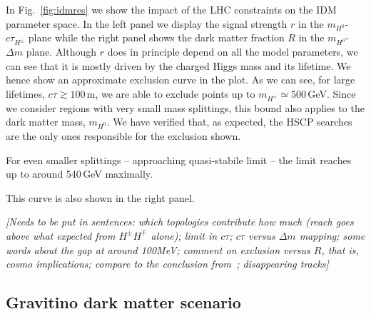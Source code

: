 \documentclass[preprint,number,sort&compress,twocolumn,3p]{elsstyarticle}
\newcommand{\Hn}{{H^0}}
\newcommand{\Hp}{{H^\pm}}
\newcommand{\com}[1]{\emph{\color{red}[#1]}}  %
\begin{document}
In Fig.~\ref{fig:idmres} we show the impact of the LHC constraints on the IDM parameter space. 
In the left panel we display the signal strength $r$
in the $m_\Hn$-$c\tau_{H^\pm}$ plane while the right panel shows
the dark matter fraction $R$ in the $m_\Hn$-$\Delta m$ plane.
Although $r$ does in principle depend on all the model parameters,
we can see that it is mostly driven by the charged Higgs mass and its lifetime. We hence show an approximate exclusion curve in
the plot.
As we can see, for large lifetimes, $c \tau \gtrsim 100\,$m, we are able to exclude points up to $m_\Hp\simeq 500\,$GeV.
Since we consider regions with very small mass splittings, this bound also applies to the dark matter mass, $m_\Hn$.
We have verified that, as expected, the HSCP searches are the only ones responsible for the exclusion shown.



 For even smaller splittings -- approaching quasi-stabile limit --
the limit reaches up to around 540\,GeV maximally. 









This curve is also shown in the right panel.

\com{Needs to be put in sentences: which topologies contribute how much (reach goes above what expected from $H^\pm H^\mp$ alone); limit in $c\tau$; $c\tau$ versus $\Delta m $ mapping;
some words about the gap at around 100MeV; comment on exclusion versus $R$, that is, cosmo implications;
compare to the conclusion from~\cite{Belyaev:2016lok}; disappearing tracks}


\subsection{Gravitino dark matter scenario}\label{sec:grav}
\end{document}
